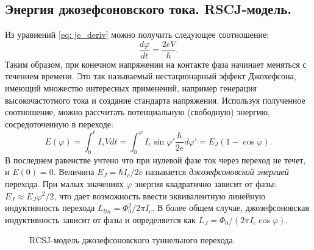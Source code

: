 \subsection{Энергия джозефсоновского тока. RSCJ-модель.}
Из уравнений \eqref{eq: je_deriv} можно получить следующее соотношение:
\begin{equation}
\frac{d\varphi}{dt} = \frac{2eV}{\hbar}.
\label{eq: dphidt}
\end{equation}
Таким образом, при конечном напряжении на контакте фаза начинает меняться с течением времени. Это так называемый нестационарный эффект Джохефсона, имеющий множество интересных применений, например генерация высокочастотного тока и создание стандарта напряжения. Используя полученное соотношение, можно рассчитать потенциальную (свободную) энергию, сосредоточенную в переходе:
\begin{equation}
\label{eq:EJ}  
E(\varphi) = \int_{0}^{t}I_sVdt = \int_{0}^{\varphi} I_c\sin \varphi' \frac{\hbar}{2e} {d\varphi'} = E_J(1-\cos\varphi).
\end{equation}
В последнем равенстве учтено что при нулевой фазе ток через переход не течет, и $E(0)=0$. Величина $E_J = {\hbar I_c}/{2e}$ называется \textit{джозефсоновской энергией} перехода. При малых значениях $\varphi$ энергия квадратично зависит от фазы: $E_J\approx E_J \varphi^2/2$, что дает возможность ввести эквивалентную линейную индуктивность перехода $L_{lin} = \Phi_0^2/2\pi I_c$. В более общем случае, джозефсоновская индуктивность зависит от фазы и определяется как $L_J = \Phi_0/(2\pi I_c \cos \varphi)$.
\begin{figure}[ht]
	{\centering
		\hfill
		\label{img:RCSJ}
		\hfill
		\def\svgwidth{2.2in}
		\label{fig: washboard}
		\hfill
	}
	\caption{RCSJ-модель джозефсоновского туннельного перехода.}
	\label{img:knuth_2}
\end{figure}

